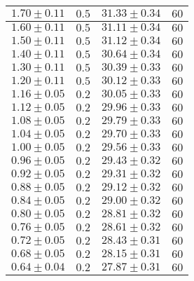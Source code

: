 \documentclass[../main.tex]{subfiles}
\begin{document}
\begin{tabular}{ ||c|c|c|c|| }
        \hline
        $1.70\pm 0.11$       & $0.5$       & $31.33\pm 0.34$  & $60$     \\
        \hline
        $1.60\pm 0.11$       & $0.5$       & $31.11\pm 0.34$  & $60$     \\
        \hline
        $1.50\pm 0.11$       & $0.5$       & $31.12\pm 0.34$ & $60$     \\
        \hline
        $1.40\pm 0.11$      & $0.5$       & $30.64\pm 0.34$ & $60$     \\
        \hline
        $1.30\pm 0.11$      & $0.5$       & $30.39\pm 0.33$ & $60$     \\
        \hline
        $1.20\pm 0.11$      & $0.5$       & $30.12\pm 0.33$ & $60$     \\
        \hline
        $1.16\pm 0.05$     & $0.2$       & $30.05\pm 0.33$  & $60$     \\
        \hline
        $1.12\pm 0.05$     & $0.2$       & $29.96\pm 0.33$  & $60$     \\
        \hline
        $1.08\pm 0.05$     & $0.2$       & $29.79\pm 0.33$  & $60$     \\
        \hline
        $1.04\pm 0.05$     & $0.2$       & $29.70\pm 0.33$   & $60$     \\
        \hline
        $1.00\pm 0.05$        & $0.2$       & $29.56\pm 0.33$  & $60$     \\
        \hline
        $0.96\pm 0.05$     & $0.2$       & $29.43\pm 0.32$  & $60$     \\
        \hline
        $0.92\pm 0.05$     & $0.2$       & $29.31\pm 0.32$  & $60$     \\
        \hline
        $0.88\pm 0.05$     & $0.2$       & $29.12\pm 0.32$ & $60$     \\
        \hline
        $0.84\pm 0.05$     & $0.2$       & $29.00\pm 0.32$     & $60$     \\
        \hline
        $0.80\pm 0.05$      & $0.2$       & $28.81\pm 0.32$ & $60$     \\
        \hline
        $0.76\pm 0.05$     & $0.2$       & $28.61\pm 0.32$  & $60$     \\
        \hline
        $0.72\pm 0.05$     & $0.2$       & $28.43\pm 0.31$  & $60$     \\
        \hline
        $0.68\pm 0.05$     & $0.2$       & $28.15\pm 0.31$ & $60$     \\
        \hline
        $0.64\pm 0.04$     & $0.2$       & $27.87\pm 0.31$ & $60$     \\
        \hline

\end{tabular}
\end{document}
